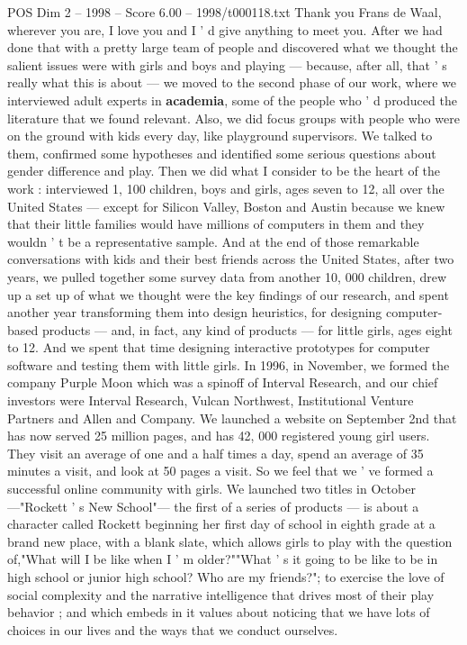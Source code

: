 \begin{textsample}{POS Dim 2 – 1998 – Score 6.00 – 1998/t000118.txt}
Thank you Frans de Waal, wherever you are, I love you and I ' d give anything to meet you.
After we had done that with a pretty large team of people and discovered what we thought the salient issues were with girls and boys and playing — because, after all, that ' s really what this is about — we moved to the second phase of our work, where we interviewed adult experts in \textbf{academia}, some of the people who ' d produced the literature that we found relevant.
Also, we did focus groups with people who were on the ground with kids every day, like playground supervisors.
We talked to them, confirmed some hypotheses and identified some serious questions about gender difference and play.
Then we did what I consider to be the heart of the work : interviewed 1, 100 children, boys and girls, ages seven to 12, all over the United States — except for Silicon Valley, Boston and Austin because we knew that their little families would have millions of computers in them and they wouldn ' t be a representative sample.
And at the end of those remarkable conversations with kids and their best friends across the United States, after two years, we pulled together some survey data from another 10, 000 children, drew up a set up of what we thought were the key findings of our research, and spent another year transforming them into design heuristics, for designing computer-based products — and, in fact, any kind of products — for little girls, ages eight to 12.
And we spent that time designing interactive prototypes for computer software and testing them with little girls.
In 1996, in November, we formed the company Purple Moon which was a spinoff of Interval Research, and our chief investors were Interval Research, Vulcan Northwest, Institutional Venture Partners and Allen and Company.
We launched a website on September 2nd that has now served 25 million pages, and has 42, 000 registered young girl users.
They visit an average of one and a half times a day, spend an average of 35 minutes a visit, and look at 50 pages a visit.
So we feel that we ' ve formed a successful online community with girls.
We launched two titles in October —"Rockett ' s New School"— the first of a series of products — is about a character called Rockett beginning her first day of school in eighth grade at a brand new place, with a blank slate, which allows girls to play with the question of,"What will I be like when I ' m older?""What ' s it going to be like to be in high school or junior high school?
Who are my friends?"; to exercise the love of social complexity and the narrative intelligence that drives most of their play behavior ; and which embeds in it values about noticing that we have lots of choices in our lives and the ways that we conduct ourselves.

\end{textsample}
